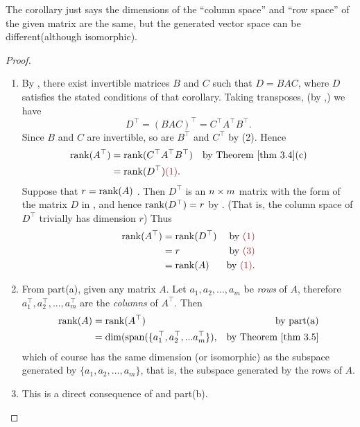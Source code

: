 \begin{note}
The corollary just says the dimensions of the ``column space'' and ``row space'' of the given matrix are the same,
but the generated vector space can be different(although isomorphic).
\end{note}

\begin{proof} \ 

\begin{enumerate}
\item By , there exist invertible matrices \(B\) and \(C\) such that \(D = BAC\), where \(D\) satisfies the stated conditions of that corollary.
Taking transposes, (by ,) we have
\[
    D^\top = (BAC)^\top = C^\top A^\top B^\top.
\]
Since \(B\) and \(C\) are invertible, so are \(B^\top\) and \(C^\top\) by (2).
Hence
\begin{align*}
    \rank(A^\top) & = \rank(C^\top A^\top B^\top) & \text{by \THM{3.4}(c)} \\
                  & = \rank(D^\top) \MAROON{(1)}.
\end{align*}
Suppose that \(r = \mathrm{rank}(A)\) .
Then \(D^\top\) is an \(n \times m\) matrix with the form of the matrix \(D\) in , and hence \(\mathrm{rank}(D^\top) = r\)  by .
(That is, the column space of \(D^\top\) trivially has dimension \(r\))
Thus
\begin{align*}
    \rank(A^\top) & = \rank(D^\top) & \text{by \MAROON{(1)}} \\
                  & = r & \text{by \MAROON{(3)}} \\
                  & = \rank(A) & \text{by \MAROON{(1)}}.
\end{align*}

\item From part(a), given any matrix \(A\).
Let \(a_1, a_2, ..., a_m\) be \emph{rows} of \(A\), therefore \(a_1^\top, a_2^\top, ..., a_m^\top\) are the \emph{columns} of \(A^\top\).
Then
\begin{align*}
    \rank(A) & = \rank(A^\top) & \text{by part(a)} \\
             & = \dim(\spann(\{a_1^\top, a_2^\top, ... a_m^\top\}), & \text{by \THM{3.5}}
\end{align*}
which of course has the same dimension (or isomorphic) as the subspace generated by \(\{ a_1, a_2, ..., a_m \}\),
that is, the subspace generated by the rows of \(A\).

\item This is a direct consequence of  and part(b).
\end{enumerate}
\end{proof}

